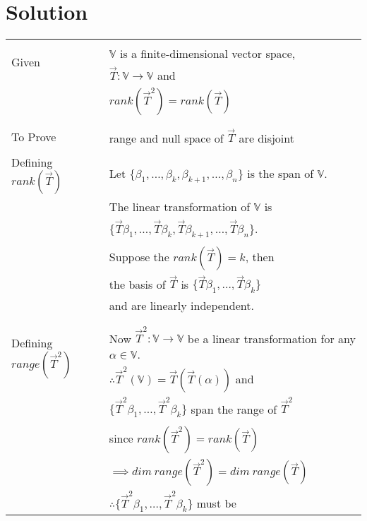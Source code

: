 \documentclass[journal,12pt]{IEEEtran}
\begin{document}
\section{\textbf{Solution}}
\renewcommand{\thetable}{1}
\begin{longtable}{|l|l|}
\hline
\multirow{3}{*}{Given} & \\
& $\mathbb{V}$ is a finite-dimensional vector space,\\
& $\vec{T}:\mathbb{V} \rightarrow \mathbb{V}$ and\\
& $ rank (\vec{T}^2) = rank (\vec{T})$\\
&\\
\hline
\multirow{3}{*}{To Prove} & \\
& range and null space of $\vec{T}$ are disjoint\\
&\\
\hline
\multirow{3}{*}{Defining $rank(\vec{T})$} & \\
& Let $\lbrace \beta_1,\ldots,\beta_k,\beta_{k+1},\ldots,\beta_n \rbrace$ is the span of $\mathbb{V}$.\\
& \\
& The linear transformation of $\mathbb{V}$ is\\
& $\lbrace \vec{T}\beta_1,\ldots,\vec{T}\beta_k,\vec{T}\beta_{k+1},\ldots,\vec{T}\beta_n \rbrace$.\\
& \\
& Suppose the $rank (\vec{T}) = k$, then \\
& the basis of $\vec{T}$ is $\lbrace \vec{T}\beta_1,\ldots,\vec{T}\beta_k \rbrace$ \\
& and are linearly independent.\\
& \\
\hline
\multirow{3}{*}{Defining $range(\vec{T}^2)$} & \\
& Now $\vec{T}^2 : \mathbb{V} \rightarrow \mathbb{V}$ be a linear transformation for any $\alpha \in \mathbb{V}$.  \\
& $\therefore \vec{T}^2(\mathbb{V}) = \vec{T}(\vec{T}(\alpha))$ and \\
& $\lbrace \vec{T}^2\beta_1,\ldots,\vec{T}^2\beta_k \rbrace$ span the range of $\vec{T}^2$\\
& \\
& since $ rank (\vec{T}^2) = rank (\vec{T})$\\
& $\implies dim \  range (\vec{T}^2) = dim \  range (\vec{T})$\\
& $\therefore \lbrace \vec{T}^2\beta_1,\ldots,\vec{T}^2\beta_k \rbrace$ must be\\

\end{longtable}
\end{document}
